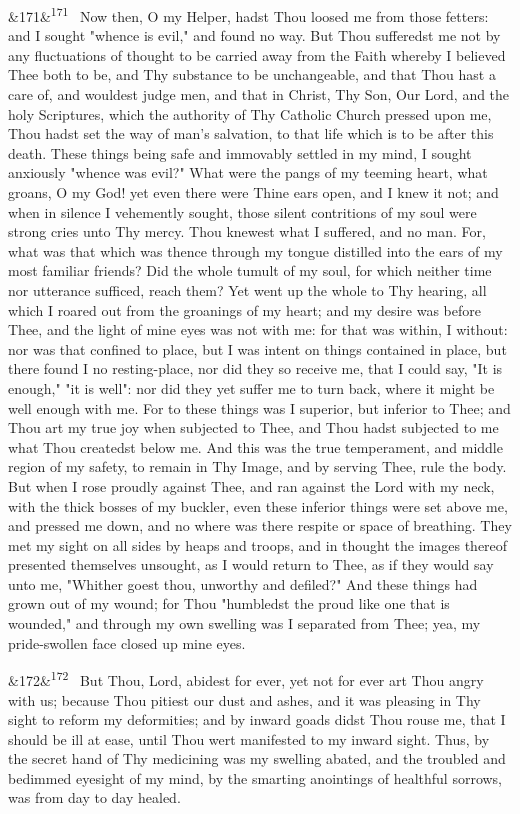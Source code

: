 \documentclass[12pt]{article}
\newcommand{\para}[1][]{\par\noindent\ifx&#1&\else\textsuperscript{\footnotesize #1}~\fi}
\begin{document}
\para[171] Now then, O my Helper, hadst Thou loosed me from those fetters: and I sought "whence is evil," and found no way. But Thou sufferedst me not by any fluctuations of thought to be carried away from the Faith whereby I believed Thee both to be, and Thy substance to be unchangeable, and that Thou hast a care of, and wouldest judge men, and that in Christ, Thy Son, Our Lord, and the holy Scriptures, which the authority of Thy Catholic Church pressed upon me, Thou hadst set the way of man's salvation, to that life which is to be after this death. These things being safe and immovably settled in my mind, I sought anxiously "whence was evil?" What were the pangs of my teeming heart, what groans, O my God! yet even there were Thine ears open, and I knew it not; and when in silence I vehemently sought, those silent contritions of my soul were strong cries unto Thy mercy. Thou knewest what I suffered, and no man. For, what was that which was thence through my tongue distilled into the ears of my most familiar friends? Did the whole tumult of my soul, for which neither time nor utterance sufficed, reach them? Yet went up the whole to Thy hearing, all which I roared out from the groanings of my heart; and my desire was before Thee, and the light of mine eyes was not with me: for that was within, I without: nor was that confined to place, but I was intent on things contained in place, but there found I no resting-place, nor did they so receive me, that I could say, "It is enough," "it is well": nor did they yet suffer me to turn back, where it might be well enough with me. For to these things was I superior, but inferior to Thee; and Thou art my true joy when subjected to Thee, and Thou hadst subjected to me what Thou createdst below me. And this was the true temperament, and middle region of my safety, to remain in Thy Image, and by serving Thee, rule the body. But when I rose proudly against Thee, and ran against the Lord with my neck, with the thick bosses of my buckler, even these inferior things were set above me, and pressed me down, and no where was there respite or space of breathing. They met my sight on all sides by heaps and troops, and in thought the images thereof presented themselves unsought, as I would return to Thee, as if they would say unto me, "Whither goest thou, unworthy and defiled?" And these things had grown out of my wound; for Thou "humbledst the proud like one that is wounded," and through my own swelling was I separated from Thee; yea, my pride-swollen face closed up mine eyes.

\para[172] But Thou, Lord, abidest for ever, yet not for ever art Thou angry with us; because Thou pitiest our dust and ashes, and it was pleasing in Thy sight to reform my deformities; and by inward goads didst Thou rouse me, that I should be ill at ease, until Thou wert manifested to my inward sight. Thus, by the secret hand of Thy medicining was my swelling abated, and the troubled and bedimmed eyesight of my mind, by the smarting anointings of healthful sorrows, was from day to day healed.
\end{document}
